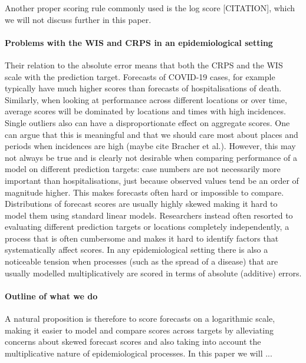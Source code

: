 \documentclass{article}
\begin{document}
Another proper scoring rule commonly used is the log score [CITATION], which we will not discuss further in this paper.  

\paragraph{Problems with the WIS and CRPS in an epidemiological setting}
Their relation to the absolute error means that both the CRPS and the WIS scale with the prediction target. Forecasts of COVID-19 cases, for example typically have much higher scores than forecasts of hospitalisations of death. Similarly, when looking at performance across different locations or over time, average scores will be dominated by locations and times with high incidences. Single outliers also can have a disproportionate effect on aggregate scores. One can argue that this is meaningful and that we should care most about places and periods when incidences are high (maybe cite Bracher et al.). However, this may not always be true and is clearly not desirable when comparing performance of a model on different prediction targets: case numbers are not necessarily more important than hospitalisations, just because observed values tend be an order of magnitude higher. This makes forecasts often hard or impossible to compare. Distributions of forecast scores are usually highly skewed making it hard to model them using standard linear models. Researchers instead often resorted to evaluating different prediction targets or locations completely independently, a process that is often cumbersome and makes it hard to identify factors that systematically affect scores. In any epidemiological setting there is also a noticeable tension when processes (such as the spread of a disease) that are usually modelled multiplicatively are scored in terms of absolute (additive) errors. 

\paragraph{Outline of what we do} 
A natural proposition is therefore to score forecasts on a logarithmic scale, making it easier to model and compare scores across targets by alleviating concerns about skewed forecast scores and also taking into account the multiplicative nature of epidemiological processes. In this paper we will ...

\end{document}
